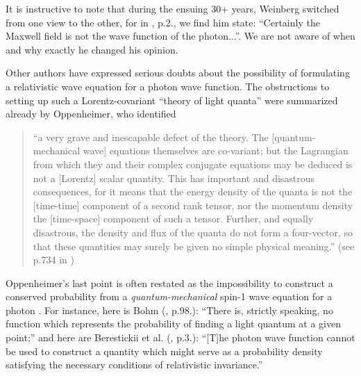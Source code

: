 \documentclass[11pt]{article}
\theoremstyle{definition}
\numberwithin{equation}{section}
\begin{document}
 It is instructive to note that during the ensuing 30+ years, Weinberg switched from one view to the other, for
in \cite{WeinbergTALK}, p.2., we find him state: ``Certainly the Maxwell field is not the wave function of the photon...''.
 We are not aware of when and why exactly he changed his opinion.

 Other authors have expressed serious doubts about the possibility of formulating a relativistic wave equation for a photon wave function.
 The obstructions to setting up such a Lorentz-covariant ``theory of light quanta'' were summarized already by 
Oppenheimer, who identified \vspace{-5pt}
\begin{quotation}
\noindent
``a very grave and inescapable defect of the theory. The [quantum-mechanical wave] equations themselves are co-variant; 
but the Lagrangian from which they and their complex conjugate equations may be deduced is not a [Lorentz] scalar quantity. 
 This has important and disastrous consequences, for it means that the energy density of the quanta is not the [time-time]
component of a second rank tensor, nor the momentum density the [time-space] component of such a tensor.
 Further, and equally disastrous, the density and flux of the quanta do not form a four-vector, so that these quantities
 may surely be given no simple physical meaning.'' (see p.734 in \cite{OppiPHOTON}) 
\end{quotation}

\noindent
 Oppenheimer's last point is often restated as the impossibility to construct a conserved
probability from a  \emph{quantum-mechanical} spin-1 wave equation for a photon
\cite{LandauLifshitzBOOKrelQM,BohmBOOKonQM,WeinbergBOOKqft}.
 For instance, here is Bohm (\cite{BohmBOOKonQM}, p.98.): ``There is, strictly speaking, no function which represents the  
probability of finding a light quantum at a given point;'' and here are Berestickii et al.
(\cite{LandauLifshitzBOOKrelQM}, p.3.): 
``[T]he photon wave function cannot be used to construct a quantity which might serve as a probability density
satisfying the necessary conditions of relativistic invariance.'' 

\end{document}
